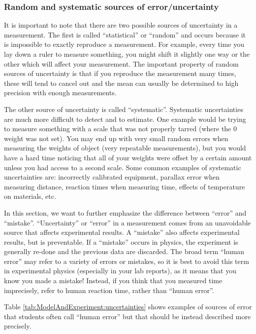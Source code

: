 \subsubsection{Random and systematic sources of error/uncertainty}
It is important to note that there are two possible sources of uncertainty in a measurement. The first is called ``statistical'' or ``random'' and occurs because it is impossible to exactly reproduce a measurement. For example, every time you lay down a ruler to measure something, you might shift it slightly one way or the other which will affect your measurement. The important property of random sources of uncertainty is that if you reproduce the measurement many times, these will tend to cancel out and the mean can usually be determined to high precision with enough measurements. 

The other source of uncertainty is called ``systematic''. Systematic uncertainties are much more difficult to detect and to estimate. One example would be trying to measure something with a scale that was not properly tarred (where the 0 weight was not set). You may end up with very small random errors when measuring the weights of object (very repeatable measurements), but you would have a hard time noticing that all of your weights were offset by a certain amount unless you had access to a second scale. Some common examples of systematic uncertainties are: incorrectly calibrated equipment, parallax error when measuring distance, reaction times when measuring time, effects of temperature on materials, etc.

In this section, we want to further emphasize the difference between ``error'' and ``mistake''. ``Uncertainty'' or ``error'' in a measurement comes from an unavoidable source that affects experimental results. A ``mistake'' also affects experimental results, but is preventable. If a ``mistake'' occurs in physics, the experiment is generally re-done and the previous data are discarded. The broad term ``human error'' may refer to a variety of errors or mistakes, so it is best to avoid this term in experimental physics (especially in your lab reports), as it means that you know you made a mistake! Instead, if you think that you measured time imprecisely, refer to human reaction time, rather than ``human error''.

Table \ref{tab:ModelAndExperiment:uncertainties} shows examples of sources of error that students often call ``human error'' but that should be instead described more precisely.

